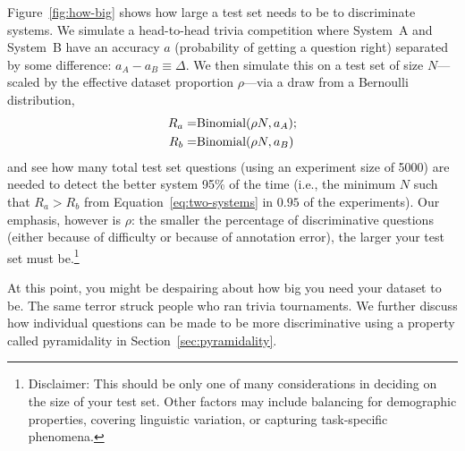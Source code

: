 Figure~\ref{fig:how-big} shows how large a test set needs to be to discriminate systems. 
We simulate a head-to-head trivia competition where System~A and System~B have an accuracy $a$ (probability of getting a question right) separated by some difference: $a_A - a_B \equiv \Delta$.
We then simulate this on a test set of size $N$---scaled by the effective dataset proportion $\rho$---via a draw from a Bernoulli distribution,
\begin{align}
    R_a = & \mbox{Binomial}(\rho N, a_A); \notag \\
    R_b = & \mbox{Binomial}(\rho N, a_B)
    \label{eq:two-systems}
\end{align}
and see how many total test set questions (using an experiment size of 5000) are needed to detect the better system 95\% of the time (i.e., the minimum $N$ such that $R_a > R_b$ from Equation~\ref{eq:two-systems} in $0.95$ of the experiments).
Our emphasis, however is $\rho$: the smaller the percentage of discriminative questions (either because of difficulty or because of annotation error), the larger your test set must be.\footnote{Disclaimer: This should be only one of many considerations in deciding on the size of your test set.  Other factors may include balancing for demographic properties, covering linguistic variation, or capturing task-specific phenomena.}

At this point, you might be despairing about how big you need your dataset to be.
The same terror struck people who ran trivia tournaments.
We further discuss how individual questions can be made to be more discriminative using a property called pyramidality in Section~\ref{sec:pyramidality}.

